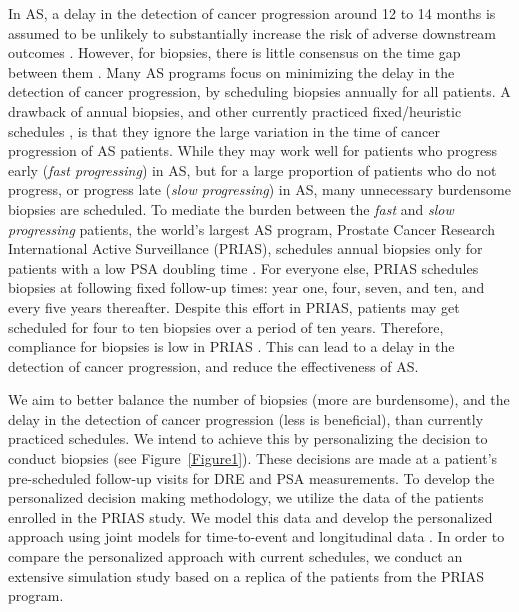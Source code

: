\documentclass[a4paper, 12pt]{article}
\begin{document}
In AS, a delay in the detection of cancer progression around 12 to 14 months is assumed to be unlikely to substantially increase the risk of adverse downstream outcomes \citep{inoue2018comparative,carvalho}. However, for biopsies, there is little consensus on the time gap between them \citep{loeb2014heterogeneity,bruinsma2016active,nieboer2018active}. Many AS programs focus on minimizing the delay in the detection of cancer progression, by scheduling biopsies annually for all patients. A drawback of annual biopsies, and other currently practiced fixed/heuristic schedules \citep{loeb2014heterogeneity,bruinsma2016active,nieboer2018active}, is that they ignore the large variation in the time of cancer progression of AS patients. While they may work well for patients who progress early (\textit{fast progressing}) in AS, but for a large proportion of patients who do not progress, or progress late (\textit{slow progressing}) in AS, many unnecessary burdensome biopsies are scheduled. To mediate the burden between the \textit{fast} and \textit{slow progressing} patients, the world's largest AS program, Prostate Cancer Research International Active Surveillance \citep{bokhorst2016decade} (PRIAS), schedules annual biopsies only for patients with a low PSA doubling time \citep{bokhorst2015compliance}. For everyone else, PRIAS schedules biopsies at following fixed follow-up times: year one, four, seven, and ten, and every five years thereafter. Despite this effort in PRIAS, patients may get scheduled for four to ten biopsies over a period of ten years. Therefore, compliance for biopsies is low in PRIAS \citep{bokhorst2015compliance}. This can lead to a delay in the detection of cancer progression, and reduce the effectiveness of AS.

We aim to better balance the number of biopsies (more are burdensome), and the delay in the detection of cancer progression (less is beneficial), than currently practiced schedules. We intend to achieve this by personalizing the decision to conduct biopsies (see Figure~\ref{Figure1}). These decisions are made at a patient's pre-scheduled follow-up visits for DRE and PSA measurements. To develop the personalized decision making methodology, we utilize the data of the patients enrolled in the PRIAS study. We model this data and develop the personalized approach using joint models for time-to-event and longitudinal data \citep{tsiatis2004joint,rizopoulos2012joint}. In order to compare the personalized approach with current schedules, we conduct an extensive simulation study based on a replica of the patients from the PRIAS program. 
\end{document}
